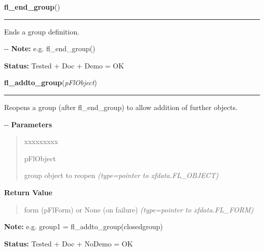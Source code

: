     \vspace{0.5ex}

\hspace{.8\funcindent}\begin{boxedminipage}{\funcwidth}

    \raggedright \textbf{fl\_end\_group}()

    \vspace{-1.5ex}

    \rule{\textwidth}{0.5\fboxrule}
\setlength{\parskip}{2ex}

Ends a group definition.

-{}-
\setlength{\parskip}{1ex}
\textbf{Note:} 
e.g. fl\_end\_group()


\textbf{Status:} 
Tested + Doc + Demo = OK


    \end{boxedminipage}

    \label{xformslib:flbasic:fl_addto_group}

    \vspace{0.5ex}

\hspace{.8\funcindent}\begin{boxedminipage}{\funcwidth}

    \raggedright \textbf{fl\_addto\_group}(\textit{pFlObject})

    \vspace{-1.5ex}

    \rule{\textwidth}{0.5\fboxrule}
\setlength{\parskip}{2ex}

Reopens a group (after fl\_end\_group) to allow addition of further
objects.

-{}-
\setlength{\parskip}{1ex}
      \textbf{Parameters}
      \vspace{-1ex}

      \begin{quote}
        \begin{Ventry}{xxxxxxxxx}

          \item[pFlObject]


group object to reopen
            {\it (type=pointer to xfdata.FL\_OBJECT)}

        \end{Ventry}

      \end{quote}

      \textbf{Return Value}
    \vspace{-1ex}

      \begin{quote}

form (pFlForm) or None (on failure)
      {\it (type=pointer to xfdata.FL\_FORM)}

      \end{quote}

\textbf{Note:} 
e.g. group1 = fl\_addto\_group(closedgroup)


\textbf{Status:} 
Tested + Doc + NoDemo = OK


    \end{boxedminipage}

